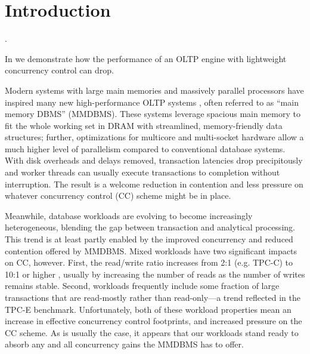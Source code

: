 
\section{Introduction}

 \cite{Corbett+12,BailisFHGS14,ThomsonA10}. 


In  we demonstrate how the performance of an OLTP engine with lightweight concurrency control can drop.

Modern systems with large main memories and massively parallel processors have inspired many new high-performance OLTP systems \cite{Kallman+08,KemperN11,LarsonBDFPZ11,TuZKLM13}, often referred to as ``main memory DBMS'' (MMDBMS). These systems leverage spacious main memory to fit the whole working set in DRAM with streamlined, memory-friendly data structures; further, optimizations for multicore and multi-socket hardware allow a much higher level of parallelism compared to conventional database systems. With disk overheads and delays removed, transaction latencies drop precipitously and worker threads can usually execute transactions to completion without interruption. The result is a welcome reduction in contention and less pressure on whatever concurrency control (CC) scheme might be in place.

Meanwhile, database workloads are evolving to become increasingly heterogeneous, blending the gap between transaction and analytical processing. This trend is at least partly enabled by the improved concurrency and reduced contention offered by MMDBMS. Mixed workloads have two significant impacts on CC, however. First, the read/write ratio increases from 2:1 (e.g. TPC-C) to 10:1 or higher \cite{Chen+10,TozunPKJA13}, usually by increasing the number of reads as the number of writes remains stable. Second, workloads frequently include some fraction of large transactions that are read-mostly rather than read-only---a trend reflected in the TPC-E \cite{TPCE} benchmark. Unfortunately, both of these workload properties mean an increase in effective concurrency control footprints, and increased pressure on the CC scheme. As is usually the case, it appears that our workloads stand ready to absorb any and all concurrency gains the MMDBMS has to offer.

